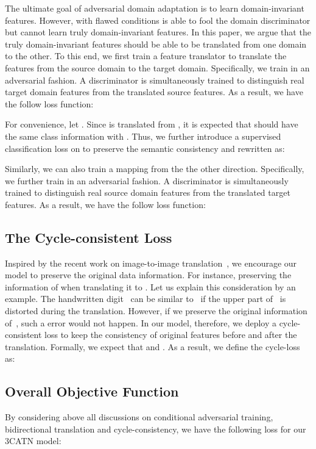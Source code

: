 \documentclass[sigconf]{acmart}
\begin{document}
The ultimate goal of adversarial domain adaptation is to learn domain-invariant features. However,  with flawed conditions is able to fool the domain discriminator but cannot learn truly domain-invariant features. In this paper, we argue that the truly domain-invariant features should be able to be translated from one domain to the other. To this end, we first train a feature translator  to translate the features from the source domain to the target domain. Specifically, we train  in an adversarial fashion. A discriminator  is simultaneously trained to distinguish real target domain features from the translated source features. As a result, we have the follow loss function:
 

For convenience, let . Since  is translated from , it is expected that  should have the same class information with . Thus, we further introduce a supervised classification loss on  to preserve the semantic consistency and rewritten  as:



Similarly, we can also train a mapping from the the other direction. Specifically, we further train  in an adversarial fashion. A discriminator  is simultaneously trained to distinguish real source domain features from the translated target features. As a result, we have the follow loss function:
 

\subsection{The Cycle-consistent Loss}
Inspired by the recent work on image-to-image translation~\cite{zhu2017unpaired}, we encourage our model to preserve the original data information. For instance, preserving the information of  when translating it to . Let us explain this consideration by an example. The handwritten digit~ can be similar to~ if the upper part of~ is distorted during the translation. However, if we preserve the original information of~, such a error would not happen. In our model, therefore, we deploy a cycle-consistent loss to keep the consistency of original features before and after the translation. Formally, we expect that  and . As a result, we define the cycle-loss as:
 

\subsection{Overall Objective Function}
By considering above all discussions on conditional adversarial training, bidirectional translation and cycle-consistency, we have the following loss for our 3CATN model:
 
\end{document}
